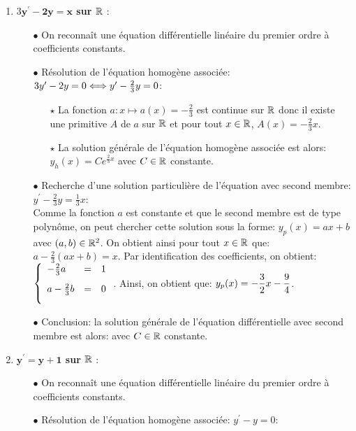 \documentclass[a4paper, 11pt,reqno]{article}
\begin{document}
\begin{correction}
\begin{enumerate}
 \item \textbf{$3\mathbf{y^{\prime}-2y=x}$ sur $\mathbb{R}$} :\\
 \begin{itemize}
\item[$\bullet$] On reconna\^{i}t une \'equation diff\'erentielle lin\'eaire du premier ordre \`{a} coefficients  constants.
\item[$\bullet$] R\'esolution de l'\'equation homog\`{e}ne associ\'ee: $3y^{\prime}-2y=0 \Longleftrightarrow y^{\prime}-\frac{2}{3}y=0 $:\\
\begin{itemize}
\item[$\star$] La fonction $a: x\mapsto a(x)=-\frac{2}{3}$ est continue sur $\mathbb{R}$ donc il existe une primitive $A$ de $a$ sur $\mathbb{R}$ et pour tout $x\in\mathbb{R}$, $A(x)=-\frac{2}{3}x$.
\item[$\star$] La solution g\'en\'erale de l'\'equation homog\`{e}ne associ\'ee est alors: $y_h(x) = Ce^{\frac{2}{3}x}$ avec $C\in\mathbb{R}$ constante.
\end{itemize}
\item[$\bullet$] Recherche d'une solution particuli\`{e}re de l'\'equation avec second membre: $y^{\prime}-\frac{2}{3}y=\frac{1}{3}x$:\\
\noindent Comme la fonction $a$ est constante et que le second membre est de type polyn\^{o}me, on peut chercher cette solution sous la forme: $y_p(x)= ax+b$ avec $(a,b)\in\mathbb{R}^2$. On obtient ainsi pour tout $x\in\mathbb{R}$ que: $a-\frac{2}{3}(ax+b) =x$. Par identification des coefficients, on obtient: 
$\left\lbrace \begin{array}{lll}  -\frac{2}{3}a&=&1\vsec\\ a-\frac{2}{3}b&=&0\vsec\\ \end{array} \right.$. Ainsi, on obtient que: $y_p(x)= -\displaystyle\frac{3}{2}x-\frac{9}{4}$.
\item[$\bullet$] Conclusion: la solution g\'en\'erale de l'\'equation diff\'erentielle avec second membre est alors:  avec $C\in\mathbb{R}$ constante.
\end{itemize}


 \item \textbf{$\mathbf{y^{\prime}=y+1}$ sur $\mathbb{R}$} :\\
 \begin{itemize}
\item[$\bullet$] On reconna\^{i}t une \'equation diff\'erentielle lin\'eaire du premier ordre \`{a} coefficients  constants.
\item[$\bullet$] R\'esolution de l'\'equation homog\`{e}ne associ\'ee: $y^{\prime}-y=0 $:\\
\begin{itemize}


\end{itemize}
\end{itemize}
\end{enumerate}
\end{correction}
\end{document}
